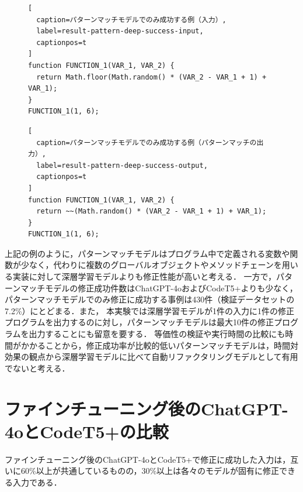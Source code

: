 \documentclass[11pt]{jreport}
\newcommand{\fixtwo}[1]{#1}
\begin{document}
\begin{figure}[t]
\captionsetup{name=Listing}
\hspace{0.04\columnwidth}
\begin{minipage}[b]{0.96\linewidth}
\begin{lstlisting}[
  caption=パターンマッチモデルでのみ成功する例（入力）,
  label=result-pattern-deep-success-input,
  captionpos=t
]
function FUNCTION_1(VAR_1, VAR_2) {
  return Math.floor(Math.random() * (VAR_2 - VAR_1 + 1) + VAR_1);
}
FUNCTION_1(1, 6);
\end{lstlisting}
\end{minipage}

\hspace{0.04\columnwidth}
\begin{minipage}[b]{0.96\linewidth}
\begin{lstlisting}[
  caption=パターンマッチモデルでのみ成功する例（パターンマッチの出力）,
  label=result-pattern-deep-success-output,
  captionpos=t
]
function FUNCTION_1(VAR_1, VAR_2) {
  return ~~(Math.random() * (VAR_2 - VAR_1 + 1) + VAR_1);
}
FUNCTION_1(1, 6);
\end{lstlisting}
\end{minipage}
\end{figure}


\fixtwo{上記の例のように，パターンマッチモデルはプログラム中で定義される変数や関数が少なく，代わりに複数のグローバルオブジェクトやメソッドチェーンを用いる実装に対して深層学習モデルよりも修正性能が高いと考える．}
\fixtwo{一方で，パターンマッチモデルの修正成功件数はChatGPT-4oおよびCodeT5+よりも少なく，パターンマッチモデルでのみ修正に成功する事例は430件（検証データセットの7.2\%）にとどまる．また，}
本実験では深層学習モデルが1件の入力に1件の修正プログラムを出力するのに対し，パターンマッチモデルは最大10件の修正プログラムを出力することにも留意を要する．
等価性の検証や実行時間の比較にも時間がかかることから，修正成功率が比較的低いパターンマッチモデルは，時間対効果の観点から深層学習モデルに比べて自動リファクタリングモデルとして有用でないと考える．




\section{\fixtwo{ファインチューニング後の}ChatGPT-4oとCodeT5+の比較}


\fixtwo{ファインチューニング後の}ChatGPT-4oとCodeT5+で修正に成功した入力は，互いに60\%以上が共通しているものの，30\%以上は各々のモデルが固有に修正できる入力である．
\end{document}
